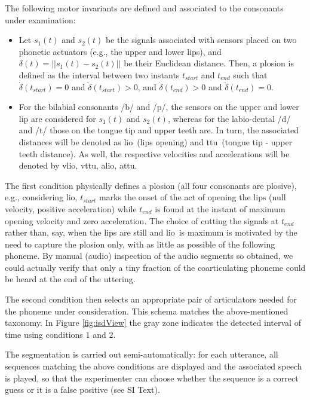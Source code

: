\documentclass{pnastwo}
\newcommand{\lio}{\textsf{lio}}
\newcommand{\ttu}{\textsf{ttu}}
\newcommand{\vlio}{\textsf{vlio}}
\newcommand{\vttu}{\textsf{vttu}}
\newcommand{\alio}{\textsf{alio}}
\newcommand{\attu}{\textsf{attu}}
\begin{document}
\begin{article}
The following motor invariants are defined and associated to the consonants under
examination:

\begin{itemize}

  \item Let $s_1(t)$ and $s_2(t)$ be the signals associated
    with sensors placed on two phonetic actuators (e.g., the upper and
    lower lips), and $\delta(t) = ||s_1(t)-s_2(t)||$ be their
    Euclidean distance. Then, a plosion is defined as the interval
    between two instants $t_{start}$ and $t_{end}$ such that
    $\dot{\delta}(t_{start}) = 0 $ and $\ddot{\delta}(t_{start}) > 0$,
    and $\dot{\delta}(t_{end}) > 0 $ and $\ddot{\delta}(t_{end}) = 0$.

  \item For the bilabial consonants /b/ and /p/, the sensors on the upper and lower
    lip are considered for $s_1(t)$ and $s_2(t)$, whereas for the labio-dental /d/ and /t/
    those on the tongue tip and upper teeth are. In turn, the associated
    distances will be denoted as \lio\ (lips opening) and \ttu\
    (tongue tip - upper teeth distance). As well, the respective velocities
    and accelerations will be denoted by \vlio, \vttu, \alio, \attu.

\end{itemize}

The first condition physically defines a plosion (all four consonants are plosive), e.g., considering \lio, $t_{start}$
marks the onset of the act of opening the lips (null velocity, positive acceleration)
while $t_{end}$ is found at the instant of maximum opening velocity and zero acceleration.
The choice of cutting the signals at $t_{end}$ rather than, say, when the lips are still
and \lio\ is maximum is motivated by the need to capture the plosion only, with as little
as possible of the following phoneme. By manual (audio) inspection of the audio segments so
obtained, we could actually verify that only a tiny fraction of the coarticulating phoneme
could be heard at the end of the uttering.

The second condition then selects an appropriate pair of articulators needed for the
phoneme under consideration. This schema matches the above-mentioned taxonomy. In Figure
\ref{fig:isdView} the gray zone indicates the detected interval of time using conditions
$1$ and $2$.
 
The segmentation is carried out semi-automatically: for each
utterance, all sequences matching the above conditions are displayed and the
associated speech is played, so that the experimenter can choose whether the
sequence is a correct guess or it is a false positive (see SI Text).


\end{article}
\end{document}
